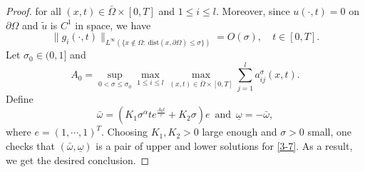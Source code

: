 \documentclass[10pt,a4paper]{amsart}
\begin{document}
\begin{proof}
for all $(x,t)\in\bar{\Omega}\times[0,T]$ and $1\leq i \leq l$.
Moreover, since $u(\cdot,t)=0$ on $\partial\Omega$ and $\tilde u$ is $C^{1}$ in space, we have
\begin{equation*}
\|g_{i}(\cdot,t)\|_{L^\infty(\{x\notin\Omega:\ \mathrm{dist}(x,\partial\Omega)\le\sigma\})} = O(\sigma),
\quad t\in[0,T].
\end{equation*}
Let $\sigma_0\in(0,1]$ and
$$A_{0}= \sup_{0<\sigma \leq \sigma_{0}} \max_{1\leq i \leq l} \max_{ (x,t)\in \bar{\Omega}\times [0,T] } \sum_{j=1}^{l} a^{\sigma}_{ij}(x,t).$$
Define
\begin{equation*}
\bar{\omega}= \left(K_{1}\sigma^{\alpha}te^{\frac{A_{0}t}{\tau}}+K_{2}\sigma \right)e \enspace\text{and}\enspace\underline{\omega}=
-\bar{\omega},
\end{equation*}
where $e= (1,\cdots,1)^{T}$.
Choosing $K_{1},K_{2}>0$ large enough and $\sigma>0$ small, one checks that $(\bar{\omega},\underline{\omega})$ is a pair of upper and lower solutions for \eqref{3-7}.
As a result, we get the desired conclusion.
\end{proof}
\end{document}
